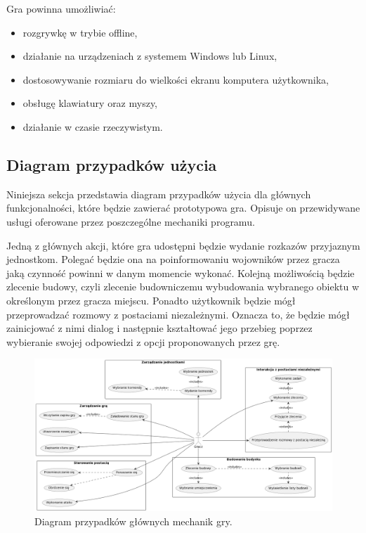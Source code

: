 Gra powinna umożliwiać:
\begin{itemize}\label{list:nonfun}
  \item rozgrywkę w trybie offline,
  \item działanie na urządzeniach z systemem Windows lub Linux,
  \item dostosowywanie rozmiaru do wielkości ekranu komputera użytkownika,
  \item obsługę klawiatury oraz myszy,
  \item działanie w czasie rzeczywistym.
\end{itemize}

\subsection{Diagram przypadków użycia}\label{ss:usecase}
Niniejsza sekcja przedstawia diagram przypadków użycia dla głównych funkcjonalności, które będzie zawierać prototypowa gra.
Opisuje on przewidywane usługi oferowane przez poszczególne mechaniki programu.

Jedną z głównych akcji, które gra udostępni będzie wydanie rozkazów przyjaznym jednostkom. Polegać będzie ona na poinformowaniu
wojowników przez gracza jaką czynność powinni w danym momencie wykonać. Kolejną możliwością będzie zlecenie budowy, czyli
zlecenie budowniczemu wybudowania wybranego obiektu w określonym przez gracza miejscu. Ponadto użytkownik
będzie mógł przeprowadzać rozmowy z postaciami niezależnymi. Oznacza to, że będzie mógł zainicjować z nimi dialog i
następnie kształtować jego przebieg poprzez wybieranie swojej odpowiedzi z opcji proponowanych przez grę.

\begin{figure}[!htbp]
    \centering
    \includegraphics[width=1.0\textwidth]{images/diagrams/usecase.jpg}
    \caption{Diagram przypadków głównych mechanik gry.}\label{fig:usecases_d}
\end{figure}
\FloatBarrier

